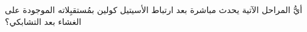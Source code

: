 
\begin{question}

\begin{instance}

\begin{mcq}[standalone=false]

\begin{stem}
أيُّ المراحل الآتية يحدث مباشرة بعد ارتباط الأسيتيل كولين بمُستقبِلاته الموجودة على الغشاء بعد التشابكي؟\par{}
\end{stem}

\begin{distractors}
        
\end{distractors}

\end{mcq}

\end{instance}

\end{question}
